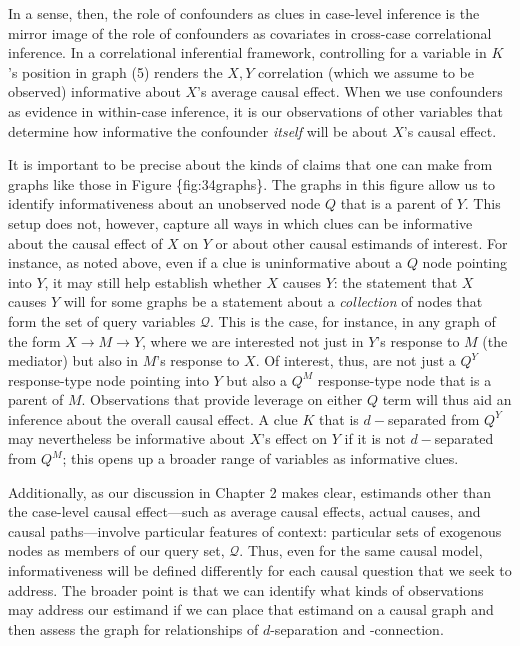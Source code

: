 \documentclass[
  12pt,
]{book}
\begin{document}
In a sense, then, the role of confounders as clues in case-level inference is the mirror image of the role of confounders as covariates in cross-case correlational inference. In a correlational inferential framework, controlling for a variable in \(K\)'s position in graph (5) renders the \(X, Y\) correlation (which we assume to be observed) informative about \(X\)'s average causal effect. When we use confounders as evidence in within-case inference, it is our observations of other variables that determine how informative the confounder \emph{itself} will be about \(X\)'s causal effect.

It is important to be precise about the kinds of claims that one can make from graphs like those in Figure \{fig:34graphs\}. The graphs in this figure allow us to identify informativeness about an unobserved node \(Q\) that is a parent of \(Y\). This setup does not, however, capture all ways in which clues can be informative about the causal effect of \(X\) on \(Y\) or about other causal estimands of interest. For instance, as noted above, even if a clue is uninformative about a \(Q\) node pointing into \(Y\), it may still help establish whether \(X\) causes \(Y\): the statement that \(X\) causes \(Y\) will for some graphs be a statement about a \emph{collection} of nodes that form the set of query variables \(\mathcal Q\). This is the case, for instance, in any graph of the form \(X \rightarrow M \rightarrow Y\), where we are interested not just in \(Y\)'s response to \(M\) (the mediator) but also in \(M\)'s response to \(X\). Of interest, thus, are not just a \(Q^Y\) response-type node pointing into \(Y\) but also a \(Q^M\) response-type node that is a parent of \(M\). Observations that provide leverage on either \(Q\) term will thus aid an inference about the overall causal effect. A clue \(K\) that is \(d-\)separated from \(Q^Y\) may nevertheless be informative about \(X\)'s effect on \(Y\) if it is not \(d-\)separated from \(Q^M\); this opens up a broader range of variables as informative clues.

Additionally, as our discussion in Chapter 2 makes clear, estimands other than the case-level causal effect---such as average causal effects, actual causes, and causal paths---involve particular features of context: particular sets of exogenous nodes as members of our query set, \(\mathcal Q\). Thus, even for the same causal model, informativeness will be defined differently for each causal question that we seek to address. The broader point is that we can identify what kinds of observations may address our estimand if we can place that estimand on a causal graph and then assess the graph for relationships of \(d\)-separation and -connection.
\end{document}
